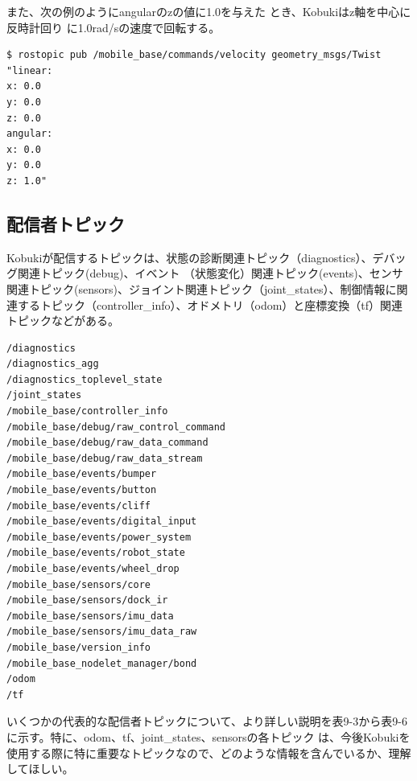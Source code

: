 \begin{itemize}
また、次の例のようにangularのzの値に1.0を与えた    とき、Kobukiはz軸を中心に反時計回り  に1.0rad/sの速度で回転する。

\begin{lstlisting}[language=ROS]
$ rostopic pub /mobile_base/commands/velocity geometry_msgs/Twist "linear:
x: 0.0
y: 0.0
z: 0.0
angular:
x: 0.0
y: 0.0
z: 1.0"
\end{lstlisting}

\subsection{配信者トピック}

Kobukiが配信するトピックは、状態の診断関連トピック（diagnostics）、デバッグ関連トピック(debug)、イベント  （状態変化）関連トピック(events)、センサ関連トピック(sensors)、ジョイント関連トピック（joint\_states）、制御情報に関連するトピック（controller\_info）、オドメトリ（odom）と座標変換（tf）関連トピックなどがある。

\begin{lstlisting}[language=ROS]
/diagnostics
/diagnostics_agg
/diagnostics_toplevel_state
/joint_states
/mobile_base/controller_info
/mobile_base/debug/raw_control_command
/mobile_base/debug/raw_data_command
/mobile_base/debug/raw_data_stream
/mobile_base/events/bumper
/mobile_base/events/button
/mobile_base/events/cliff
/mobile_base/events/digital_input
/mobile_base/events/power_system
/mobile_base/events/robot_state
/mobile_base/events/wheel_drop
/mobile_base/sensors/core
/mobile_base/sensors/dock_ir
/mobile_base/sensors/imu_data
/mobile_base/sensors/imu_data_raw
/mobile_base/version_info
/mobile_base_nodelet_manager/bond
/odom
/tf
\end{lstlisting}

いくつかの代表的な配信者トピックについて、より詳しい説明を表9-3から表9-6に示す。特に、odom、tf、joint\_states、sensorsの各トピック  は、今後Kobukiを使用する際に特に重要なトピックなので、どのような情報を含んでいるか、理解してほしい。


\end{itemize}
